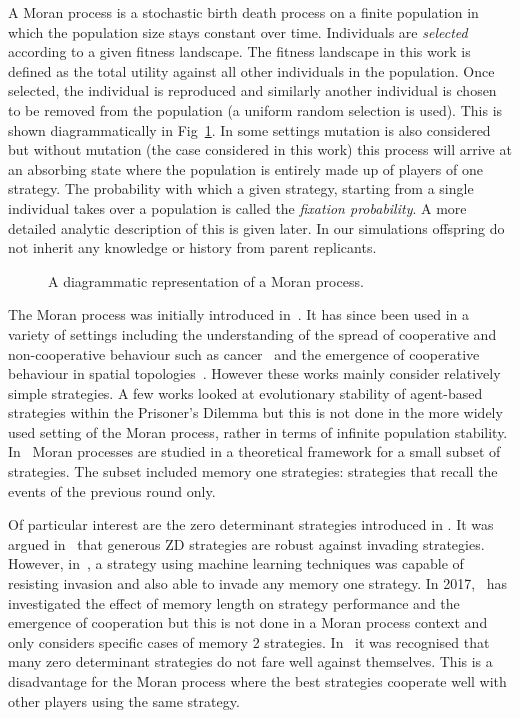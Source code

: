 \documentclass[10pt,letterpaper]{article}
\begin{document}
A Moran process is a stochastic birth death process on a finite population in which the
population size stays constant over time. Individuals are \textit{selected}
according to a given fitness landscape. The fitness landscape in this work is
defined as the total utility against all other individuals in the population.
Once selected, the individual
is reproduced and similarly another individual is chosen to be removed from the
population (a uniform random selection is used). This is shown diagrammatically
in Fig~\ref{fig:moran_process}. In some settings mutation is
also considered but without mutation (the case considered in this work) this
process will arrive at an absorbing state where the population is entirely made
up of players of one strategy. The probability with which a given strategy,
starting from a single individual takes
over a population is called the \textit{fixation probability}. A more detailed
analytic description of this is given later. In our
simulations offspring do not inherit any knowledge or history from parent
replicants.

\begin{figure}[!hbtp]
    \centering
    \caption{A diagrammatic representation of a Moran process.}
    \label{fig:moran_process}
\end{figure}

The Moran process was initially introduced in~\cite{Moran1957}. It has since
been used in a variety of settings including the understanding of the spread of
cooperative and non-cooperative behaviour such as cancer~\cite{West2016} and the
emergence of cooperative behaviour in spatial topologies~\cite{Nowak2017}.
However these works mainly consider relatively simple strategies. A few works
looked at evolutionary stability of agent-based strategies within the Prisoner's Dilemma
\cite{Li2014} but this is not done in the more widely used setting of the Moran
process, rather in terms of infinite population stability. In~\cite{Baek2016}
Moran processes are studied in a theoretical framework for a small subset of
strategies. The subset included memory one strategies: strategies that recall
the events of the previous round only.

Of particular interest are the zero determinant strategies introduced in
\cite{Press2012}. It was argued in~\cite{stewart2013extortion} that generous
ZD strategies are robust against invading strategies. However, in~\cite{Lee2015},
a strategy using machine learning techniques was capable of resisting invasion
and also able to invade any memory one strategy. In 2017,~\cite{Hilbe2017}
has investigated the effect of memory length on strategy performance and the
emergence of cooperation but this is not done in a Moran process context and only
considers specific cases of memory 2 strategies. In~\cite{Adami2013} it was
recognised that many zero determinant strategies do not fare well against
themselves. This is a disadvantage for the Moran process where the best
strategies cooperate well with other players using the same strategy.
\end{document}
